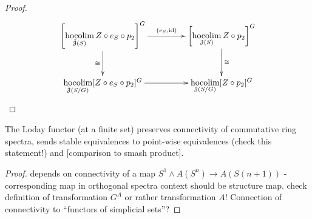 \begin{lem}
\begin{proof}
      \begin{displaymath}
        \xymatrix@C+2em{
          \left[ \hocolim\limits_{\tilde{\cJ}(S)} Z \circ e_S \circ p_2
            \right]^G
            \ar[r]^-{(e_S, \id)}
            \ar[d]_-{\cong}
          &
          \left[\hocolim\limits_{\cJ(S)} Z \circ p_2 \right]^G
            \ar[d]^-{\cong}
          \\
          \hocolim\limits_{\tilde{\cJ}(S/G)} [Z \circ e_S \circ p_2]^G
            \ar[r]
          &
          \hocolim\limits_{\cJ(S/G)} [Z \circ p_2 ]^G
        }
      \end{displaymath}
    \end{proof}
  \end{lem}
  \begin{lem}\label{lem_loday_functor_preserves_connectivity}
    The Loday functor (at a finite set) preserves connectivity of commutative
    ring spectra, sends stable equivalences to point-wise equivalences (check
    this statement!) and [comparison to smash product].
    \begin{proof}
      depends on connectivity of a map $S^1 \wedge A(S^n) \to A(S(n+1))$ -
      corresponding map in orthogonal spectra context should be structure map.
      check definition of transformation $G^A$ or rather transformation $A$!
      Connection of connectivity to ``functors of simplicial sets''?
    \end{proof}
  \end{lem}

